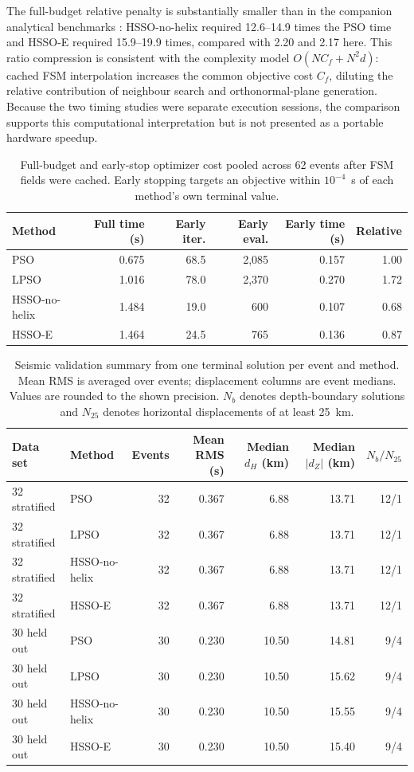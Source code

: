 \documentclass[10pt]{article}
\begin{document}
The full-budget relative penalty is substantially smaller than in the companion analytical benchmarks \citep{Parra2026Companion}: HSSO-no-helix required 12.6--14.9 times the PSO time and HSSO-E required 15.9--19.9 times, compared with 2.20 and 2.17 here. This ratio compression is consistent with the complexity model $O(NC_f+N^2d)$: cached FSM interpolation increases the common objective cost $C_f$, diluting the relative contribution of neighbour search and orthonormal-plane generation. Because the two timing studies were separate execution sessions, the comparison supports this computational interpretation but is not presented as a portable hardware speedup.

\begin{table}[H]
\centering\small
\caption{Full-budget and early-stop optimizer cost pooled across 62 events after FSM fields were cached. Early stopping targets an objective within $10^{-4}$~s of each method's own terminal value.}
\label{tab:runtime}
\begin{tabular}{lrrrrr}
\toprule
Method & Full time (s) & Early iter. & Early eval. & Early time (s) & Relative\\
\midrule
PSO & 0.675 & 68.5 & 2,085 & 0.157 & 1.00\\
LPSO & 1.016 & 78.0 & 2,370 & 0.270 & 1.72\\
HSSO-no-helix & 1.484 & 19.0 & 600 & 0.107 & 0.68\\
HSSO-E & 1.464 & 24.5 & 765 & 0.136 & 0.87\\
\bottomrule
\end{tabular}
\end{table}

\begin{table}[H]
\centering\small
\caption{Seismic validation summary from one terminal solution per event and method. Mean RMS is averaged over events; displacement columns are event medians. Values are rounded to the shown precision. $N_b$ denotes depth-boundary solutions and $N_{25}$ denotes horizontal displacements of at least 25~km.}
\label{tab:seismic}
\begin{tabular}{llrrrrr}
\toprule
Data set & Method & Events & Mean RMS (s) & Median $d_H$ (km) & Median $|d_Z|$ (km) & $N_b/N_{25}$\\
\midrule
32 stratified & PSO & 32 & 0.367 & 6.88 & 13.71 & 12/1\\
32 stratified & LPSO & 32 & 0.367 & 6.88 & 13.71 & 12/1\\
32 stratified & HSSO-no-helix & 32 & 0.367 & 6.88 & 13.71 & 12/1\\
32 stratified & HSSO-E & 32 & 0.367 & 6.88 & 13.71 & 12/1\\
30 held out & PSO & 30 & 0.230 & 10.50 & 14.81 & 9/4\\
30 held out & LPSO & 30 & 0.230 & 10.50 & 15.62 & 9/4\\
30 held out & HSSO-no-helix & 30 & 0.230 & 10.50 & 15.55 & 9/4\\
30 held out & HSSO-E & 30 & 0.230 & 10.50 & 15.40 & 9/4\\
\bottomrule
\end{tabular}
\end{table}
\end{document}
